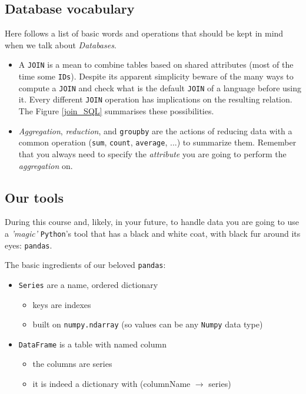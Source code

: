 \subsection*{Database vocabulary}

Here follows a list of basic words and operations that should be kept in mind when we talk about \emph{Databases}.

 \begin{itemize}
  \item A \texttt{JOIN} is a mean to combine tables based on shared attributes (most of the time some \texttt{IDs}). Despite its apparent simplicity beware of the many ways to compute a \texttt{JOIN} and check what is the default \texttt{JOIN} of a language before using it. Every different \texttt{JOIN} operation has implications on the resulting relation. The Figure \ref{join_SQL} summarises these possibilities.
  \item \emph{Aggregation}, \emph{reduction}, and \texttt{groupby} are the actions of reducing data with a common operation (\texttt{sum}, \texttt{count}, \texttt{average}, ...) to summarize them. Remember that you always need to specify the \emph{attribute} you are going to perform the \emph{aggregation} on.
 \end{itemize}
  
\subsection{Our tools}

During this course and, likely, in your future, to handle data you are going to use a \emph{'magic'} \texttt{Python}'s tool that has a black and white coat, with black fur around its eyes: \texttt{pandas}. 

The basic ingredients of our beloved \texttt{pandas}:

\begin{itemize}
 \item \texttt{Series} are a name, ordered dictionary
\begin{itemize}
 \item keys are indexes
 \item built on \texttt{numpy.ndarray} (so values can be any \texttt{Numpy} data type)
\end{itemize} 
\end{itemize}


\begin{itemize} 
 \item \texttt{DataFrame} is a table with named column
  \begin{itemize}
  \item the columns are series
  \item it is indeed a dictionary with (columnName $\rightarrow$ series)
  \end{itemize}  
\end{itemize}

